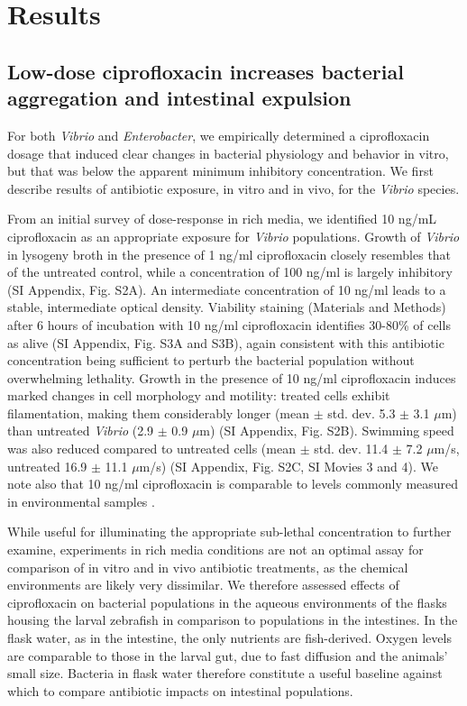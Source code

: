 \section*{Results}

\subsection*{Low-dose ciprofloxacin increases bacterial aggregation and intestinal expulsion}

For both \textit{Vibrio} and \textit{Enterobacter}, we empirically determined a ciprofloxacin dosage that induced clear changes in bacterial physiology and behavior in vitro, but that was below the apparent minimum inhibitory concentration. We first describe results of antibiotic exposure, in vitro and in vivo, for the \textit{Vibrio} species. 

From an initial survey of dose-response in rich media, we identified 10 ng/mL ciprofloxacin as an appropriate exposure for \textit{Vibrio} populations. Growth of \textit{Vibrio} in lysogeny broth in the presence of 1 ng/ml ciprofloxacin closely resembles that of the untreated control, while a concentration of 100 ng/ml is largely inhibitory (SI Appendix, Fig. S2A). An intermediate concentration of 10 ng/ml leads to a stable, intermediate optical density. Viability staining (Materials and Methods) after 6 hours of incubation with 10 ng/ml ciprofloxacin identifies 30-80\% of cells as alive (SI Appendix, Fig. S3A and S3B), again consistent with this antibiotic concentration being sufficient to perturb the bacterial population without overwhelming lethality. Growth in the presence of 10 ng/ml ciprofloxacin induces marked changes in cell morphology and motility: treated cells exhibit filamentation, making them considerably longer (mean $\pm$ std. dev. 5.3 $\pm$ 3.1 $\mu$m) than untreated \textit{Vibrio} (2.9 $\pm$ 0.9 $\mu$m) (SI Appendix, Fig. S2B). Swimming speed was also reduced compared to untreated cells (mean $\pm$ std. dev. 11.4 $\pm$ 7.2 $\mu$m/s, untreated  16.9 $\pm$ 11.1 $\mu$m/s) (SI Appendix, Fig. S2C, SI Movies 3 and 4). We note also that 10 ng/ml ciprofloxacin is comparable to levels commonly measured in environmental samples \cite{girardi2011biodegradation}. 

While useful for illuminating the appropriate sub-lethal concentration to further examine, experiments in rich media conditions are not an optimal assay for comparison of in vitro and in vivo antibiotic treatments, as the chemical environments are likely very dissimilar. We therefore assessed effects of ciprofloxacin on bacterial populations in the aqueous environments of the flasks housing the larval zebrafish in comparison to populations in the intestines. In the flask water, as in the intestine, the only nutrients are fish-derived. Oxygen levels are  comparable to those in the larval gut, due to fast diffusion and the animals' small size. Bacteria in flask water therefore constitute a useful baseline against which to compare antibiotic impacts on intestinal populations.


